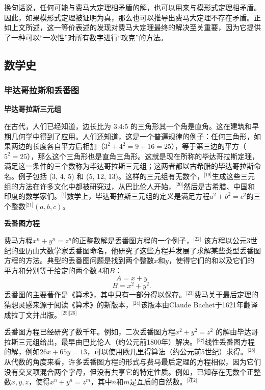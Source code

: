 换句话说，任何可能与费马大定理相矛盾的解，也可以用来与模形式定理相矛盾。因此，如果模形式定理被证明为真，那么也可以推导出费马大定理不存在矛盾。正如上文所述，这一等价表述的发现对费马大定理最终的解决至关重要，因为它提供了一种可以“一次性”对所有数字进行“攻克”的方法。
\subsection{数学史}  
\subsubsection{毕达哥拉斯和丢番图}  
\textbf{毕达哥拉斯三元组 } 

在古代，人们已经知道，边长比为 3:4:5 的三角形其一个角是直角。这在建筑和早期几何学中得到了应用。人们还知道，这是一个普遍规律的例子：任何三角形，如果两边的长度各自平方后相加（\( 3^2 + 4^2 = 9 + 16 = 25 \)），等于第三边的平方（\( 5^2 = 25 \)），那么这个三角形也是直角三角形。这就是现在所称的毕达哥拉斯定理，满足这一条件的三个数称为毕达哥拉斯三元组；这两者都以古希腊的毕达哥拉斯命名。例子包括 (3, 4, 5) 和 (5, 12, 13)。这样的三元组有无数个，\(^\text{[19]}\)生成这些三元组的方法在许多文化中都被研究过，从巴比伦人开始，\(^\text{[20]}\)然后是古希腊、中国和印度的数学家们。\(^\text{[1]}\)数学上，毕达哥拉斯三元组的定义是满足方程\( a^2 + b^2 = c^2 \)的三个整数\(^\text{[21]}\)\((a,b,c)\)。

\textbf{丢番图方程}  

费马方程\( x^n + y^n = z^n \)的正整数解是丢番图方程的一个例子，\(^\text{[22]}\) 该方程以公元3世纪的亚历山大数学家丢番图命名，他研究了这些方程并发展了求解某些类型丢番图方程的方法。典型的丢番图问题是找到两个整数\( x \)和\( y \)，使得它们的和以及它们的平方和分别等于给定的两个数\( A \)和\( B \)：
\[
A = x + y~
\]
\[
B = x^2 + y^2.~
\]
丢番图的主要著作是《算术》，其中只有一部分得以保存。\(^\text{[23]}\)费马关于最后定理的猜想灵感来源于阅读《算术》的新版本，\(^\text{[24]}\)该版本由Claude Bachet于1621年翻译成拉丁文并出版。\(^\text{[25][26]
}\)

丢番图方程已经研究了数千年。例如，二次丢番图方程\( x^2 + y^2 = z^2 \) 的解由毕达哥拉斯三元组给出，最早由巴比伦人（约公元前1800年）解决。\(^\text{[27]}\)线性丢番图方程的解，例如\( 26x + 65y = 13 \)，可以使用欧几里得算法（约公元前5世纪）求得。\(^\text{[28]}\)从代数的角度来看，许多丢番图方程的形式与费马最后定理的方程相似，因为它们没有交叉项混合两个字母，但没有共享它的特定性质。例如，已知存在无数个正整数\( x, y, z \)，使得\( x^n + y^n = z^m \)，其中\( n \)和\( m \)是互质的自然数。\(^\text{[注2]}\)
